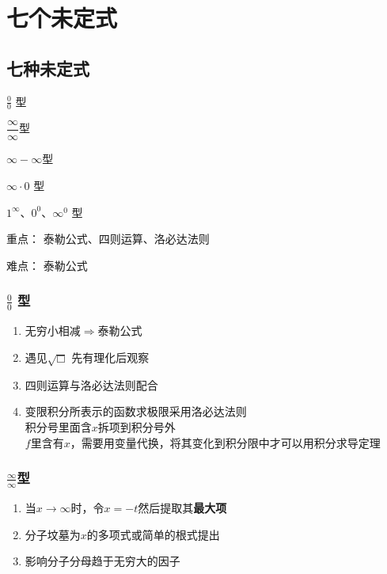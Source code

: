 \section{七个未定式}

\subsection{七种未定式}

\begin{LearnningObjectivesBox}[4]
	\begin{learningtargets}
		\item $\frac{0}{0}$ 型
		\item {\small $\dfrac{\infty}{\infty}$}型
		\item {\small ${\infty}-{\infty}$}型
		\item  ${\infty}\cdot{0}$ 型
		\item $1^{\infty} 、0^0 、{\infty^0} $ 型
	\end{learningtargets}
\end{LearnningObjectivesBox}
\begin{KeyandDifficultyBox}[4]
	\begin{learningkeys}
		\item[重点：] 泰勒公式、四则运算、洛必达法则
		\item[难点：] 泰勒公式
	\end{learningkeys}
\end{KeyandDifficultyBox}

\subsubsection{$\frac{0}{0}$ 型}
	\begin{enumerate}
		\item 无穷小相减$\Rightarrow$泰勒公式
		\item 遇见$\sqrt{\Box}$ 先有理化后观察
		\item 四则运算与洛必达法则配合
		\item 变限积分所表示的函数求极限采用洛必达法则\\
			 积分号里面含$x$拆项到积分号外\\
			 $f$里含有$x$，需要用变量代换，将其变化到积分限中才可以用积分求导定理
	\end{enumerate}

\subsubsection{$\frac{\infty}{\infty}$型}
	\begin{enumerate}
		\item 当$x \to \infty$时，令$x = -t$然后提取其{\bfseries 最大项}
		\item 分子坟墓为$x$的多项式或简单的根式提出
		\item 影响分子分母趋于无穷大的因子
	\end{enumerate}


